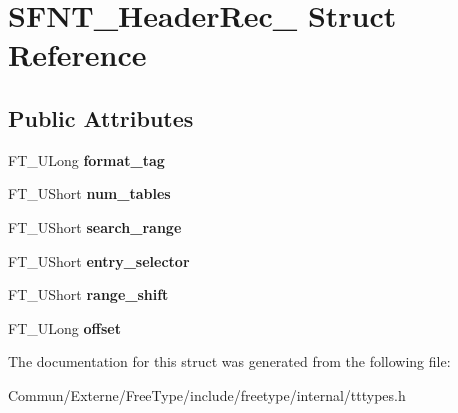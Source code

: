 \hypertarget{struct_s_f_n_t___header_rec__}{}\section{S\+F\+N\+T\+\_\+\+Header\+Rec\+\_\+ Struct Reference}
\label{struct_s_f_n_t___header_rec__}
\subsection*{Public Attributes}
\begin{DoxyCompactItemize}
\item 
F\+T\+\_\+\+U\+Long {\bfseries format\+\_\+tag}\hypertarget{struct_s_f_n_t___header_rec___ad59d649b189ab19fae02341e95e02448}{}\label{struct_s_f_n_t___header_rec___ad59d649b189ab19fae02341e95e02448}

\item 
F\+T\+\_\+\+U\+Short {\bfseries num\+\_\+tables}\hypertarget{struct_s_f_n_t___header_rec___a46d8d8bf8f2d8b6536eb5fa5704852e2}{}\label{struct_s_f_n_t___header_rec___a46d8d8bf8f2d8b6536eb5fa5704852e2}

\item 
F\+T\+\_\+\+U\+Short {\bfseries search\+\_\+range}\hypertarget{struct_s_f_n_t___header_rec___a39ca0e21eaec6be602547bb2ed898d5d}{}\label{struct_s_f_n_t___header_rec___a39ca0e21eaec6be602547bb2ed898d5d}

\item 
F\+T\+\_\+\+U\+Short {\bfseries entry\+\_\+selector}\hypertarget{struct_s_f_n_t___header_rec___ada628a85486eb034abd56b872ecdcd78}{}\label{struct_s_f_n_t___header_rec___ada628a85486eb034abd56b872ecdcd78}

\item 
F\+T\+\_\+\+U\+Short {\bfseries range\+\_\+shift}\hypertarget{struct_s_f_n_t___header_rec___aa2a39db194a8a9a0cc8504143ac4f5c1}{}\label{struct_s_f_n_t___header_rec___aa2a39db194a8a9a0cc8504143ac4f5c1}

\item 
F\+T\+\_\+\+U\+Long {\bfseries offset}\hypertarget{struct_s_f_n_t___header_rec___a04f99ce2ff335f8702a4edf7132a3e04}{}\label{struct_s_f_n_t___header_rec___a04f99ce2ff335f8702a4edf7132a3e04}

\end{DoxyCompactItemize}


The documentation for this struct was generated from the following file\+:\begin{DoxyCompactItemize}
\item 
Commun/\+Externe/\+Free\+Type/include/freetype/internal/tttypes.\+h\end{DoxyCompactItemize}
